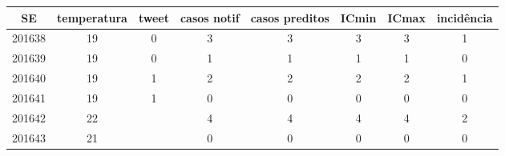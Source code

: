 \begin{tabular}{c|ccccccc}
  \hline
SE & temperatura & tweet & casos notif & casos preditos & ICmin & ICmax & incidência \\ 
  \hline
201638 & 19 & 0 & 3 & 3 & 3 & 3 & 1 \\ 
  201639 & 19 & 0 & 1 & 1 & 1 & 1 & 0 \\ 
  201640 & 19 & 1 & 2 & 2 & 2 & 2 & 1 \\ 
  201641 & 19 & 1 & 0 & 0 & 0 & 0 & 0 \\ 
  201642 & 22 &  & 4 & 4 & 4 & 4 & 2 \\ 
  201643 & 21 &  & 0 & 0 & 0 & 0 & 0 \\ 
   \hline
\end{tabular}
